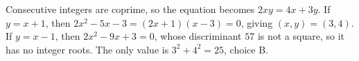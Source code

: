 Consecutive integers are coprime, so the equation becomes $2xy=4x+3y$. If $y=x+1$, then $2x^2-5x-3=(2x+1)(x-3)=0$, giving $(x,y)=(3,4)$. If $y=x-1$, then $2x^2-9x+3=0$, whose discriminant $57$ is not a square, so it has no integer roots. The only value is $3^2+4^2=\boxed{25}$, choice B.
